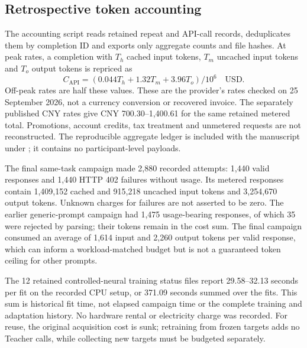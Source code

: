 \subsection{Retrospective token accounting}
The accounting script reads retained repeat and API-call records, deduplicates them by completion ID and exports only aggregate counts and file hashes. At peak rates, a completion with $T_h$ cached input tokens, $T_m$ uncached input tokens and $T_o$ output tokens is repriced as
\begin{equation}
 C_{\mathrm{API}}=(0.044T_h+1.32T_m+3.96T_o)/10^6\quad\mathrm{USD}.
\end{equation}
Off-peak rates are half these values. These are the provider's rates checked on 25 September 2026, not a currency conversion or recovered invoice. The separately published CNY rates give CNY 700.30--1,400.61 for the same retained metered total. Promotions, account credits, tax treatment and unmetered requests are not reconstructed. The reproducible aggregate ledger is included with the manuscript under ; it contains no participant-level payloads.

The final same-task campaign made 2,880 recorded attempts: 1,440 valid responses and 1,440 HTTP 402 failures without usage. Its metered responses contain 1,409,152 cached and 915,218 uncached input tokens and 3,254,670 output tokens. Unknown charges for failures are not asserted to be zero. The earlier generic-prompt campaign had 1,475 usage-bearing responses, of which 35 were rejected by parsing; their tokens remain in the cost sum. The final campaign consumed an average of 1,614 input and 2,260 output tokens per valid response, which can inform a workload-matched budget but is not a guaranteed token ceiling for other prompts.

The 12 retained controlled-neural training status files report 29.58--32.13 seconds per fit on the recorded CPU setup, or 371.09 seconds summed over the fits. This sum is historical fit time, not elapsed campaign time or the complete training and adaptation history. No hardware rental or electricity charge was recorded. For reuse, the original acquisition cost is sunk; retraining from frozen targets adds no Teacher calls, while collecting new targets must be budgeted separately.
